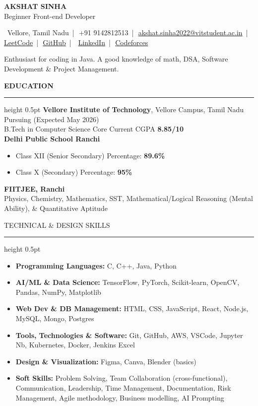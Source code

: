 \documentclass[10pt]{article}
\newcommand{\sectionrule}{\vspace{3pt}\hrule height 0.5pt \vspace{4pt}}
\newcommand{\ressection}[1]{\vspace{1pt}\textbf{#1}\sectionrule}
\newcommand{\ressectionplain}[1]{\vspace{1pt}#1\sectionrule}
\newcommand{\sep}{\,|\,}
\begin{document}
\begin{center}
{\Large\bfseries AKSHAT SINHA}\\[-1pt]
Beginner Front-end Developer
\end{center}
\centering
\normalsize
\faMapMarker*\, Vellore, Tamil Nadu \sep \faPhone\, +91 9142812513 \sep \faEnvelope\, \href{mailto:akshat.sinha2022@vitstudent.ac.in}{akshat.sinha2022@vitstudent.ac.in} \sep
\faCode\, \href{https://leetcode.com/u/akshatsinha0/}{LeetCode} \sep \faGithub\, \href{https://github.com/akshatsinha0}{GitHub} \sep
\faLinkedin\, \href{https://www.linkedin.com/in/akshat-sinha-248805214}{LinkedIn} \sep \faTrophy\, \href{https://codeforces.com/profile/akshatsinhasramhardy}{Codeforces}\\[5pt]
\raggedright
Enthusiast for coding in Java. A good knowledge of math, DSA, Software Development \& Project Management.

\ressection{EDUCATION}
\textbf{Vellore Institute of Technology}, Vellore Campus, Tamil Nadu \hfill \faCalendar*\, Pursuing (Expected May 2026)\\
B.Tech in Computer Science Core \hfill Current CGPA \textbf{8.85/10}\\[2pt]
\textbf{Delhi Public School Ranchi}\\[-2pt]
\begin{itemize}
  \item Class XII (Senior Secondary) Percentage: \textbf{89.6\%}
  \item Class X (Secondary) Percentage: \textbf{95\%}
\end{itemize}
\textbf{FIITJEE, Ranchi}\\[-2pt]
Physics, Chemistry, Mathematics, SST, Mathematical/Logical Reasoning (Mental Ability), \& Quantitative Aptitude

\ressectionplain{TECHNICAL \& DESIGN SKILLS}
\begin{itemize}
  \item \textbf{Programming Languages:} C, C++, Java, Python
  \item \textbf{AI/ML \& Data Science:} TensorFlow, PyTorch, Scikit-learn, OpenCV, Pandas, NumPy, Matplotlib
  \item \textbf{Web Dev \& DB Management:} HTML, CSS, JavaScript, React, Node.js, MySQL, Mongo, Postgres
  \item \textbf{Tools, Technologies \& Software:} Git, GitHub, AWS, VSCode, Jupyter Nb, Kubernetes, Docker, Jenkins Excel
  \item \textbf{Design \& Visualization:} Figma, Canva, Blender (basics)
  \item \textbf{Soft Skills:} Problem Solving, Team Collaboration (cross-functional), Communication, Leadership, Time Management, Documentation, Risk Management, Agile methodology, Business modelling, AI Prompting
\end{itemize}
\end{document}
